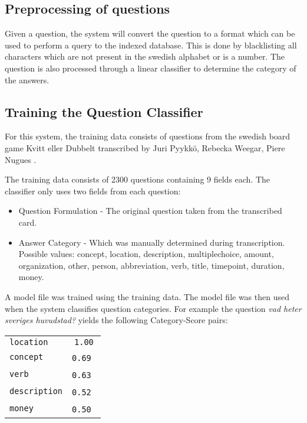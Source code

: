 \subsection{Preprocessing of questions}
Given a question, the system will convert the question
to a format which can be used to perform a query to the indexed
database. This is done by blacklisting all characters which
are not present in the swedish alphabet or is a number. The question is also
processed through a linear classifier to determine the category of the 
answers.

\subsection{Training the Question Classifier}
For this system, the training data consists of questions 
from the swedish board game Kvitt eller Dubbelt transcribed 
by Juri Pyykk\"o, Rebecka Weegar, Piere Nugues \cite{QASYS}.

The training data consists of 2300 questions containing 9 fields each.
The classifier only uses two fields from each question:
\begin{itemize}
\item Question Formulation - The original question taken from the transcribed
  card.
\item Answer Category - Which was manually determined during transcription. 
  Possible values: concept, location, description, multiplechoice, amount, organization, 
  other, person, abbreviation, verb, title, timepoint, duration, money.
\end{itemize}
A model file was trained using the training data. The model file was then used when the system 
classifies question categories. For example the question \textit{vad heter sveriges huvudstad?} 
yields the following Category-Score pairs:
\begin{center}
  \begin{tabular} {l c}
    \texttt{location}    & \texttt{1.00} \\
    \texttt{concept}     & \texttt{0.69} \\
    \texttt{verb}        & \texttt{0.63} \\
    \texttt{description} & \texttt{0.52} \\
    \texttt{money}       & \texttt{0.50} \\
  \end{tabular}
\end{center}
